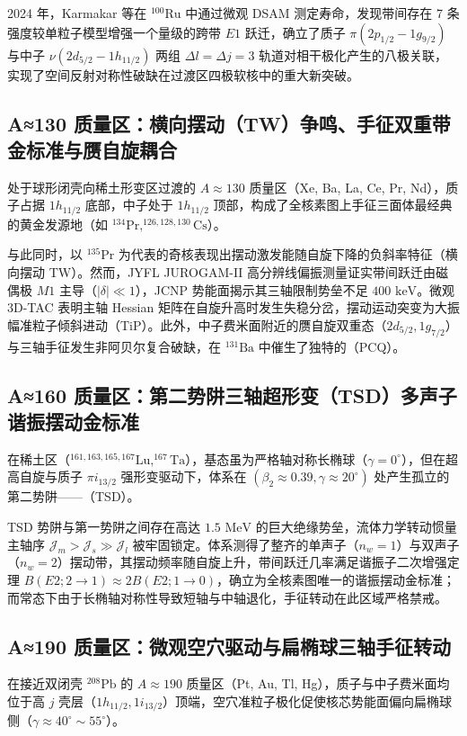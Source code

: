 2024 年，Karmakar 等在 $^{100}\text{Ru}$ 中通过微观 DSAM 测定寿命，发现带间存在 7 条强度较单粒子模型增强一个量级的跨带 $E1$ 跃迁，确立了质子 $\pi(2p_{1/2}-1g_{9/2})$ 与中子 $\nu(2d_{5/2}-1h_{11/2})$ 两组 $\Delta l=\Delta j=3$ 轨道对相干极化产生的八极关联，实现了空间反射对称性破缺在过渡区四极软核中的重大新突破。

\subsection{A≈130 质量区：横向摆动（TW）争鸣、手征双重带金标准与赝自旋耦合}
处于球形闭壳向稀土形变区过渡的 $A \approx 130$ 质量区（Xe, Ba, La, Ce, Pr, Nd），质子占据 $1h_{11/2}$ 底部，中子处于 $1h_{11/2}$ 顶部，构成了全核素图上手征三面体最经典的黄金发源地（如 $^{134}\text{Pr}, ^{126,128,130}\text{Cs}$）。

与此同时，以 $^{135}\text{Pr}$ 为代表的奇核表现出摆动激发能随自旋下降的负斜率特征（横向摆动 TW）。然而，JYFL JUROGAM-II 高分辨线偏振测量证实带间跃迁由磁偶极 $M1$ 主导（$| \delta | \ll 1$），JCNP 势能面揭示其三轴限制势垒不足 $400\text{ keV}$。微观 3D-TAC 表明主轴 Hessian 矩阵在自旋升高时发生失稳分岔，摆动运动突变为大振幅准粒子倾斜进动（TiP）。此外，中子费米面附近的赝自旋双重态（$2d_{5/2}, 1g_{7/2}$）与三轴手征发生非阿贝尔复合破缺，在 $^{131}\text{Ba}$ 中催生了独特的（PCQ）。

\subsection{A≈160 质量区：第二势阱三轴超形变（TSD）多声子谐振摆动金标准}
在稀土区（$^{161,163,165,167}\text{Lu}, ^{167}\text{Ta}$），基态虽为严格轴对称长椭球（$\gamma = 0^\circ$），但在超高自旋与质子 $\pi i_{13/2}$ 强形变驱动下，体系在 $(\beta_2 \approx 0.39, \gamma \approx 20^\circ)$ 处产生孤立的第二势阱——（TSD）。

TSD 势阱与第一势阱之间存在高达 $1.5\text{ MeV}$ 的巨大绝缘势垒，流体力学转动惯量主轴序 $\mathcal{J}_m > \mathcal{J}_s \gg \mathcal{J}_l$ 被牢固锁定。体系测得了整齐的单声子（$n_w=1$）与双声子（$n_w=2$）摆动带，其摆动频率随自旋上升，带间跃迁几率满足谐振子二次增强定理 $B(E2; 2 \to 1) \approx 2 B(E2; 1 \to 0)$，确立为全核素图唯一的谐振摆动金标准；而常态下由于长椭轴对称性导致短轴与中轴退化，手征转动在此区域严格禁戒。

\subsection{A≈190 质量区：微观空穴驱动与扁椭球三轴手征转动}
在接近双闭壳 $^{208}\text{Pb}$ 的 $A \approx 190$ 质量区（Pt, Au, Tl, Hg），质子与中子费米面均位于高 $j$ 壳层（$1h_{11/2}, 1i_{13/2}$）顶端，空穴准粒子极化促使核芯势能面偏向扁椭球侧（$\gamma \approx 40^\circ \sim 55^\circ$）。

